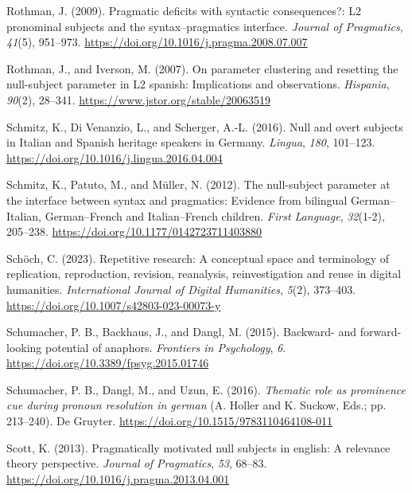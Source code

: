 \documentclass[
  letterpaper,
  DIV=11,
  numbers=noendperiod]{scrartcl}
\newlength{\cslhangindent}
\newenvironment{CSLReferences}[2] %
 {\begin{list}{}{%
  \setlength{\itemindent}{0pt}
  \setlength{\leftmargin}{0pt}
  \setlength{\parsep}{0pt}
  \ifodd #1
   \setlength{\leftmargin}{\cslhangindent}
   \setlength{\itemindent}{-1\cslhangindent}
  \fi
  \setlength{\itemsep}{#2\baselineskip}}}
 {\end{list}}
\begin{document}
\begin{CSLReferences}{1}{0}
Rothman, J. (2009). Pragmatic deficits with syntactic consequences?:
{L2} pronominal subjects and the syntax--pragmatics interface.
\emph{Journal of Pragmatics}, \emph{41}(5), 951--973.
\url{https://doi.org/10.1016/j.pragma.2008.07.007}

Rothman, J., and Iverson, M. (2007). On parameter clustering and
resetting the null-subject parameter in L2 spanish: Implications and
observations. \emph{Hispania}, \emph{90}(2), 28--341.
\url{https://www.jstor.org/stable/20063519}

Schmitz, K., Di Venanzio, L., and Scherger, A.-L. (2016). Null and overt
subjects in {Italian} and {Spanish} heritage speakers in {Germany}.
\emph{Lingua}, \emph{180}, 101--123.
\url{https://doi.org/10.1016/j.lingua.2016.04.004}

Schmitz, K., Patuto, M., and Müller, N. (2012). The null-subject
parameter at the interface between syntax and pragmatics: {Evidence}
from bilingual {German}--{Italian}, {German}--{French} and
{Italian}--{French} children. \emph{First Language}, \emph{32}(1-2),
205--238. \url{https://doi.org/10.1177/0142723711403880}

Schöch, C. (2023). Repetitive research: A conceptual space and
terminology of replication, reproduction, revision, reanalysis,
reinvestigation and reuse in digital humanities. \emph{International
Journal of Digital Humanities}, \emph{5}(2), 373--403.
\url{https://doi.org/10.1007/s42803-023-00073-y}

Schumacher, P. B., Backhaus, J., and Dangl, M. (2015). Backward- and
forward-looking potential of anaphors. \emph{Frontiers in Psychology},
\emph{6}. \url{https://doi.org/10.3389/fpsyg.2015.01746}

Schumacher, P. B., Dangl, M., and Uzun, E. (2016). \emph{Thematic role
as prominence cue during pronoun resolution in german} (A. Holler and K.
Suckow, Eds.; pp. 213--240). De Gruyter.
\url{https://doi.org/10.1515/9783110464108-011}

Scott, K. (2013). Pragmatically motivated null subjects in english: A
relevance theory perspective. \emph{Journal of Pragmatics}, \emph{53},
68--83. \url{https://doi.org/10.1016/j.pragma.2013.04.001}


\end{CSLReferences}
\end{document}

